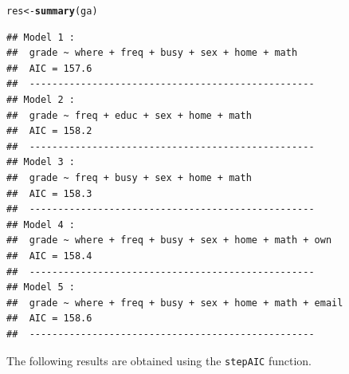 \documentclass{article}\usepackage[]{graphicx}\usepackage[]{color}
\makeatletter
\newcommand{\hlstd}[1]{\textcolor[rgb]{0.345,0.345,0.345}{#1}}%
\newcommand{\hlkwb}[1]{\textcolor[rgb]{0.69,0.353,0.396}{#1}}%
\newcommand{\hlkwd}[1]{\textcolor[rgb]{0.737,0.353,0.396}{\textbf{#1}}}%
\newenvironment{kframe}{%
 \def\at@end@of@kframe{}%
 \ifinner\ifhmode%
  \def\at@end@of@kframe{\end{minipage}}%
  \begin{minipage}{\columnwidth}%
 \fi\fi%
 \def\FrameCommand##1{\hskip\@totalleftmargin \hskip-\fboxsep
 \colorbox{shadecolor}{##1}\hskip-\fboxsep
     \hskip-\linewidth \hskip-\@totalleftmargin \hskip\columnwidth}%
 \MakeFramed {\advance\hsize-\width
   \@totalleftmargin\z@ \linewidth\hsize
   \@setminipage}}%
 {\par\unskip\endMakeFramed%
 \at@end@of@kframe}
\newenvironment{knitrout}{}{} %
\makeatother
\begin{document}
\begin{knitrout}
\color{fgcolor}\begin{kframe}
\begin{alltt}
\hlstd{res} \hlkwb{<-} \hlkwd{summary}\hlstd{(ga)}
\end{alltt}
\begin{verbatim}
## Model 1 :
##  grade ~ where + freq + busy + sex + home + math 
##  AIC = 157.6 
##  --------------------------------------------------
## Model 2 :
##  grade ~ freq + educ + sex + home + math 
##  AIC = 158.2 
##  --------------------------------------------------
## Model 3 :
##  grade ~ freq + busy + sex + home + math 
##  AIC = 158.3 
##  --------------------------------------------------
## Model 4 :
##  grade ~ where + freq + busy + sex + home + math + own 
##  AIC = 158.4 
##  --------------------------------------------------
## Model 5 :
##  grade ~ where + freq + busy + sex + home + math + email 
##  AIC = 158.6 
##  --------------------------------------------------
\end{verbatim}
\end{kframe}
\end{knitrout}

The following results are obtained using the \texttt{stepAIC} function.
\end{document}
